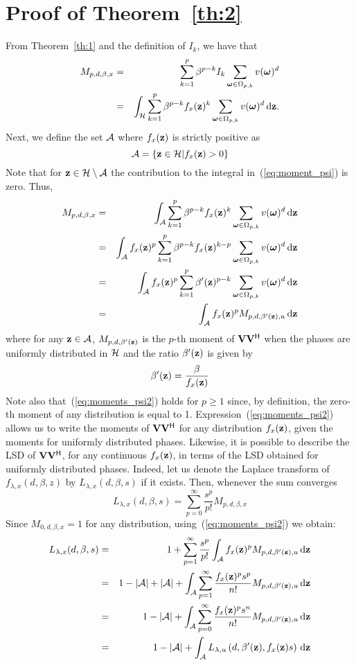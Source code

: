 \documentclass[11pt, draftcls, onecolumn, a4paper]{IEEEtran}
\newcommand{\zv}{{\bf z}}
\newcommand{\Vm}{{\bf V}}
\newcommand{\Ac}{{\cal A}}
\newcommand{\Hc}{{\cal H}}
\newcommand{\omegav}{\boldsymbol{\omega}}
\def\Herm{\mathsf{^H}}
\def\non{\nonumber\\}
\begin{document}
\section{Proof of Theorem~\ref{th:2}}
\label{app:th2}
From Theorem~\ref{th:1} and the definition of $I_k$, we have that
\begin{eqnarray} 
M_{p,d,\beta,x} &=& \sum_{k=1}^p\beta^{p-k} I_k \sum_{\omegav \in \Omega_{p,k}}v(\omegav)^d \non
&=&\int_{\Hc}\sum_{k=1}^p\beta^{p-k} f_x(\zv)^k \sum_{\omegav \in \Omega_{p,k}}v(\omegav)^d \dd \zv  .
\label{eq:moment_psi}
\end{eqnarray}
Next, we define the set $\Ac$ where $f_x(\zv)$ is strictly positive
as
\[ \Ac = \left\{ \zv \in \Hc | f_x(\zv)>0  \right\} \]
Note that for $\zv\in \Hc\setminus\Ac$ the contribution to the
  integral in~(\ref{eq:moment_psi}) is zero. Thus,
\begin{eqnarray} 
M_{p,d,\beta,x} &=& 
\int_{\Ac}\sum_{k=1}^p\beta^{p-k} f_x(\zv)^k \sum_{\omegav \in \Omega_{p,k}}v(\omegav)^d \dd \zv \non
&=&\int_{\Ac}f_x(\zv)^p \sum_{k=1}^p\beta^{p-k} f_x(\zv)^{k-p} \sum_{\omegav \in \Omega_{p,k}}v(\omegav)^d \dd \zv \non
&=&\int_{\Ac}f_x(\zv)^p  \sum_{k=1}^p\beta'(\zv)^{p-k} \sum_{\omegav \in \Omega_{p,k}}v(\omegav)^d \dd \zv \non
&=&\int_{\Ac}f_x(\zv)^p M_{p,d,\beta'(\zv),u} \dd \zv 
\label{eq:moments_psi2}
\end{eqnarray}
where for any $\zv \in \Ac$, $M_{p,d,\beta'(\zv)}$ is the $p$-th moment
of $\Vm\Vm\Herm$ when the phases are uniformly
distributed in $\Hc$ and the ratio $\beta'(\zv)$ is given by
\[ \beta'(\zv) = \frac{\beta}{f_x(\zv)} \]
Note also that~(\ref{eq:moments_psi2}) holds for $p\ge 1$ since, by
definition, the zero-th moment of any distribution is equal to
1. Expression~(\ref{eq:moments_psi2}) allows us to write the moments of
$\Vm\Vm\Herm$ for any distribution $f_x(\zv)$, given the moments for
uniformly distributed phases.  Likewise, it is possible to describe
the LSD of $\Vm\Vm\Herm$, for any continuous $f_x(\zv)$, in terms of
the LSD obtained for uniformly distributed phases.  Indeed, let us
denote the Laplace transform of $f_{\lambda,x}(d,\beta,z)$ by
$L_{\lambda,x}(d,\beta,s)$ if it exists. Then, whenever the sum
converges
\[  L_{\lambda,x}(d,\beta,s) = \sum_{p=0}^{\infty} \frac{s^p}{p!}M_{p,d,\beta,x} \]
Since $M_{0,d,\beta,x}=1$ for any distribution,
using~(\ref{eq:moments_psi2}) we obtain:
\begin{eqnarray} 
 L_{\lambda,x}(d,\beta,s)
&=& 1+\sum_{p=1}^{\infty}\frac{s^p}{p!}\int_{\Ac}f_x(\zv)^p M_{p,d,\beta'(\zv),u} \dd \zv \non
&=& 1-|\Ac|+|\Ac|+\int_{\Ac}\sum_{p=1}^{\infty}\frac{f_x(\zv)^p s^p}{n!}M_{p,d,\beta'(\zv),u}\dd \zv \non
&=& 1-|\Ac|+\int_{\Ac}\sum_{p=0}^{\infty}\frac{f_x(\zv)^p s^n}{n!}M_{p,d,\beta'(\zv),u}\dd \zv \non
 &=& 1-|\Ac|+\int_{\Ac}L_{\lambda,u}\left(d,\beta'(\zv),f_x(\zv)s\right)\dd \zv \non
\end{eqnarray}
\end{document}
